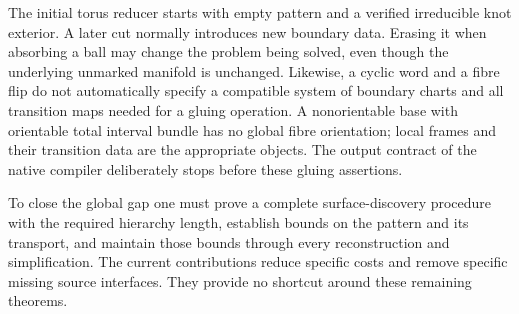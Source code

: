 The initial torus reducer starts with empty pattern and a verified
irreducible knot exterior.  A later cut normally introduces new boundary
data.  Erasing it when absorbing a ball may change the problem being
solved, even though the underlying unmarked manifold is unchanged.
Likewise, a cyclic word and a fibre flip do not automatically specify a
compatible system of boundary charts and all transition maps needed for
a gluing operation.  A nonorientable base with orientable total interval
bundle has no global fibre orientation; local frames and their transition
data are the appropriate objects.  The output contract of the native
compiler deliberately stops before these gluing assertions.

To close the global gap one must prove a complete surface-discovery
procedure with the required hierarchy length, establish bounds on the
pattern and its transport, and maintain those bounds through every
reconstruction and simplification.  The current contributions reduce
specific costs and remove specific missing source interfaces.  They
provide no shortcut around these remaining theorems.
